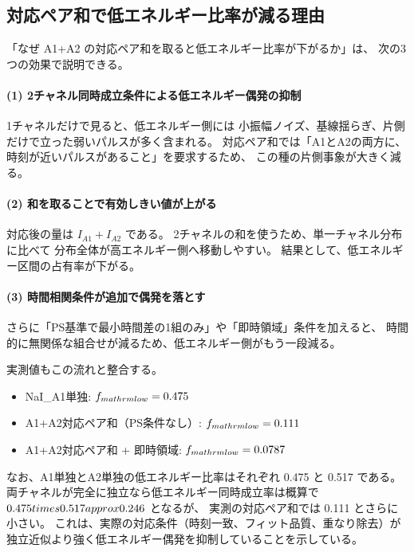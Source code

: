 \documentclass[a4paper,11pt]{jsarticle}
\begin{document}
\subsection{対応ペア和で低エネルギー比率が減る理由}
「なぜ A1+A2 の対応ペア和を取ると低エネルギー比率が下がるか」は、
次の3つの効果で説明できる。

\paragraph{(1) 2チャネル同時成立条件による低エネルギー偶発の抑制}
1チャネルだけで見ると、低エネルギー側には
小振幅ノイズ、基線揺らぎ、片側だけで立った弱いパルスが多く含まれる。
対応ペア和では「A1とA2の両方に、時刻が近いパルスがあること」を要求するため、
この種の片側事象が大きく減る。

\paragraph{(2) 和を取ることで有効しきい値が上がる}
対応後の量は $I_{A1}+I_{A2}$ である。
2チャネルの和を使うため、単一チャネル分布に比べて
分布全体が高エネルギー側へ移動しやすい。
結果として、低エネルギー区間の占有率が下がる。

\paragraph{(3) 時間相関条件が追加で偶発を落とす}
さらに「PS基準で最小時間差の1組のみ」や「即時領域」条件を加えると、
時間的に無関係な組合せが減るため、低エネルギー側がもう一段減る。

実測値もこの流れと整合する。
\begin{itemize}
  \item NaI\_A1単独: $f_{\\mathrm{low}}=0.475$
  \item A1+A2対応ペア和（PS条件なし）: $f_{\\mathrm{low}}=0.111$
  \item A1+A2対応ペア和 + 即時領域: $f_{\\mathrm{low}}=0.0787$
\end{itemize}

なお、A1単独とA2単独の低エネルギー比率はそれぞれ 0.475 と 0.517 である。
両チャネルが完全に独立なら低エネルギー同時成立率は概算で $0.475\\times0.517\\approx0.246$ となるが、
実測の対応ペア和では 0.111 とさらに小さい。
これは、実際の対応条件（時刻一致、フィット品質、重なり除去）が
独立近似より強く低エネルギー偶発を抑制していることを示している。
\end{document}
